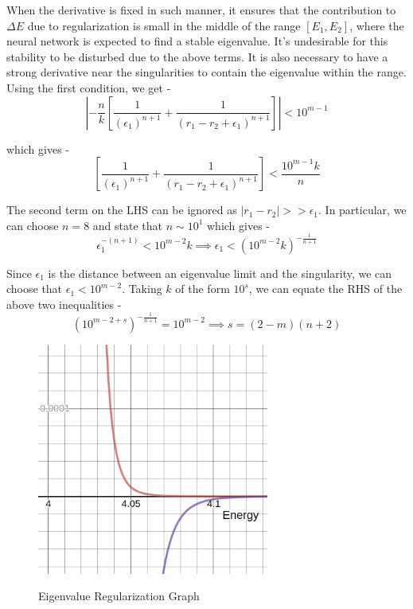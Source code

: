 \documentclass{article}
\newcommand{\oom}[1]{$10^{#1}$}
\begin{document}
\justify
When the derivative is fixed in such manner, it ensures that the contribution to $\Delta E$ due to regularization is small in the middle of the range $\left[E_1,E_2\right]$, where the neural network is expected to find a stable eigenvalue. It's undesirable for this stability to be disturbed due to the above terms. It is also necessary to have a strong derivative near the singularities to contain the eigenvalue within the range. Using the first condition, we get -
$$\displaystyle{
\left|-\frac{n}{k} \left[
\frac{1}{(\epsilon_1)^{n+1}} + \frac{1}{(r_1-r_2+\epsilon_1)^{n+1}}
\right]\right| < 10^{m-1}
}
$$

\justify
which gives -
$$\displaystyle{
\left[
\frac{1}{(\epsilon_1)^{n+1}} + \frac{1}{(r_1-r_2+\epsilon_1)^{n+1}}
\right] < \frac{10^{m-1}k}{n}
}
$$

\justify
The second term on the LHS can be ignored as $\left|r_1 - r_2\right| >> \epsilon_1$. In particular, we can choose $n=8$ and state that $n \sim 10^{1}$ which gives -
$$\displaystyle{
\epsilon_1^{-\left(n+1\right)} < 10^{m-2}k \implies \epsilon_1 < \left(10^{m-2}k\right)^{-\frac{1}{n+1}}
}
$$

\justify
Since $\epsilon_1$ is the distance between an eigenvalue limit and the singularity, we can choose that $\epsilon_1 < 10^{m-2}$. Taking $k$ of the form \oom{s}, we can equate the RHS of the above two inequalities -
$$\displaystyle{
\left(10^{m-2+s}\right)^{-\frac{1}{n+1}} = 10^{m-2} \implies s = (2 - m)(n + 2)
}$$

\begin{figure}[!htb]
    \centering
    \includegraphics[width=3.0in,height=3.0in,keepaspectratio]{Ereg.png}
    \label{fig:Ereg}
    \caption{Eigenvalue Regularization Graph}
\end{figure}
\end{document}
